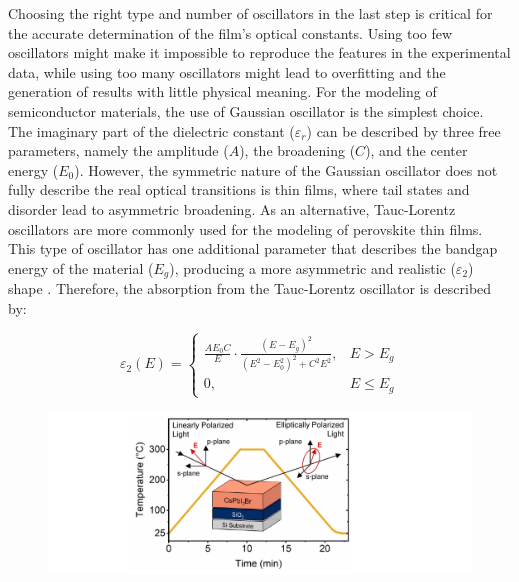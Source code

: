 Choosing the right type and number of oscillators in the last step is critical for the accurate determination of the film's optical constants. Using too few oscillators might make it impossible to reproduce the features in the experimental data, while using too many oscillators might lead to overfitting and the generation of results with little physical meaning. For the modeling of semiconductor materials, the use of Gaussian oscillator is the simplest choice. The imaginary part of the dielectric constant ($\varepsilon_r$) can be described by three free parameters, namely the amplitude ($A$), the broadening ($C$), and the center energy ($E_0$). However, the symmetric nature of the Gaussian oscillator does not fully describe the real optical transitions is thin films, where tail states and disorder lead to asymmetric broadening. As an alternative, Tauc-Lorentz oscillators are more commonly used for the modeling of perovskite thin films. This type of oscillator has one additional parameter that describes the bandgap energy of the material ($E_g$), producing a more asymmetric and realistic ($\varepsilon_2$) shape \cite{Jellison1996ParameterizationRegion}. Therefore, the absorption from the Tauc-Lorentz oscillator is described by: 

\begin{equation}
\varepsilon_2(E) =
\begin{cases}
\frac{A E_0 C}{E} \cdot \frac{(E - E_g)^2}{(E^2 - E_0^2)^2 + C^2 E^2}, & E > E_g \\
0, & E \leq E_g
\end{cases}
\label{eq:tauc_lorentz}
\end{equation}

\begin{figure}[tbp]
  \centering
  \medskip
  \includegraphics[width=.99\textwidth]{chapters/ellipsometry/image/experiment_description.pdf}
  \caption{}
  \label{fig:ellipsometry:experiment_description}
\end{figure}


